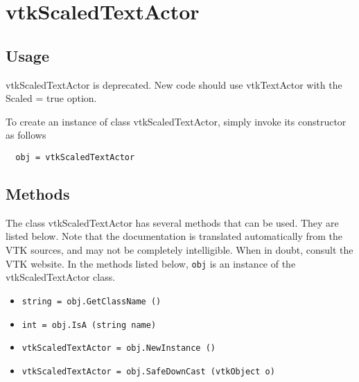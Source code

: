 \section{vtkScaledTextActor}

\subsection{Usage}

 vtkScaledTextActor is deprecated. New code should use vtkTextActor with
 the Scaled = true option.


To create an instance of class vtkScaledTextActor, simply
invoke its constructor as follows
\begin{verbatim}
  obj = vtkScaledTextActor
\end{verbatim}
\subsection{Methods}

The class vtkScaledTextActor has several methods that can be used.
  They are listed below.
Note that the documentation is translated automatically from the VTK sources,
and may not be completely intelligible.  When in doubt, consult the VTK website.
In the methods listed below, \verb|obj| is an instance of the vtkScaledTextActor class.
\begin{itemize}
\item  \verb|string = obj.GetClassName ()|

\item  \verb|int = obj.IsA (string name)|

\item  \verb|vtkScaledTextActor = obj.NewInstance ()|

\item  \verb|vtkScaledTextActor = obj.SafeDownCast (vtkObject o)|

\end{itemize}
